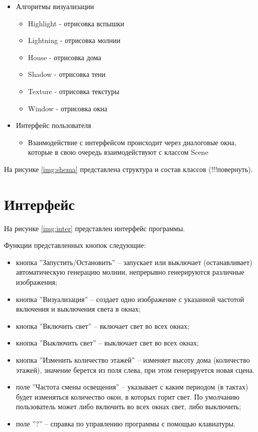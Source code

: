 \begin{itemize}
\begin{itemize}
	\end{itemize}
	\item Алгоритмы визуализации
	\begin{itemize}
		\item Highlight - отрисовка вспышки
		\item Lightning - отрисовка молнии
		\item House - отрисовка дома
		\item Shadow - отрисовка тени
		\item Texture - отрисовка текстуры
		\item Window - отрисовка окна
	\end{itemize}
	\item Интерфейс пользователя
	\begin{itemize}
		\item Взаимодействие с интерфейсом происходит через диалоговые окна, которые в свою очередь взаимодействуют с классом Scene
	\end{itemize}	
\end{itemize}

На рисунке \ref{img:shema} представлена структура и состав классов (!!!повернуть).

\clearpage

\section{Интерфейс}
На рисунке \ref{img:inter} представлен интерфейс программы.


Функции представленных кнопок следующие:
\begin{itemize}
	\item кнопка ''Запустить/Остановить'' -- запускает или выключает (останавливает) автоматическую генерацию молнии, непрерывно генерируются различные изображения;
	\item кнопка ''Визуализация'' -- создает одно изображение с указанной частотой включения и выключения света в окнах;
	\item кнопка ''Включить свет'' -- включает свет во всех окнах;
	\item кнопка ''Выключить свет'' -- выключает свет во всех окнах;
	\item кнопка ''Изменить количество этажей'' -- изменяет высоту дома (количество этажей), значение берется из поля слева, при этом генерируется новая сцена.
	\item поле ''Частота смены освещения'' -- указывает с каким периодом (в тактах) будет изменяться количество окон, в которых горит свет. По умолчанию пользователь может либо включить во всех окнах свет, либо выключить;
	\item поле ''?'' -- справка по управлению программы с помощью клавиатуры.
\end{itemize}

